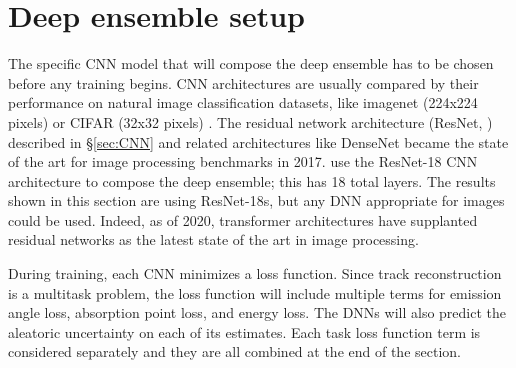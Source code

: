 


\section{Deep ensemble setup} 
\label{sec:deepset}
The specific CNN model that will compose the deep ensemble has to be chosen before any training begins. CNN architectures are usually compared by their performance on natural image classification datasets, like imagenet (224x224 pixels) or CIFAR (32x32 pixels) \citep{doon_cifar-10_2018}. The residual network architecture (ResNet, \citet{he_deep_2015}) described in \S\ref{sec:CNN} and related architectures like DenseNet \citep{huang_densely_2018} became the state of the art for image processing benchmarks in 2017. \citet{peirson_deep_2021} use the ResNet-18 CNN architecture to compose the deep ensemble; this has 18 total layers. The results shown in this section are using ResNet-18s, but any DNN appropriate for images could be used. Indeed, as of 2020, transformer architectures \citep{vaswani_attention_2017} have supplanted residual networks as the latest state of the art in image processing. 

During training, each CNN minimizes a loss function. Since track reconstruction is a multitask problem, the loss function will include multiple terms for emission angle loss, absorption point loss, and energy loss. The DNNs will also predict the aleatoric uncertainty on each of its estimates. Each task loss function term is considered separately and they are all combined at the end of the section.

